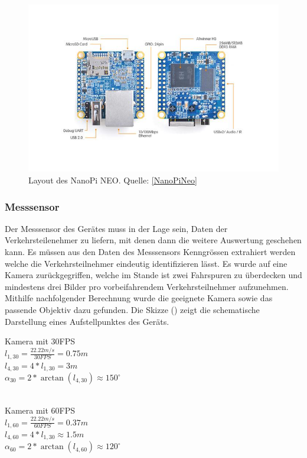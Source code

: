 \begin{figure}[H]
  \centering
  \includegraphics[height=0.6\textwidth]{Hardware/NanoPi_Neo.jpg} 
  \caption{Layout des NanoPi NEO. Quelle: \ref{NanoPiNeo}}
  \label{bLayout}
\end{figure}

\subsubsection{Messsensor}
Der Messsensor des Gerätes muss in der Lage sein, Daten der Verkehrsteilenehmer zu liefern, mit denen dann die weitere Auswertung geschehen kann. Es müssen aus den Daten des Messsensors Kenngrössen extrahiert werden welche die Verkehrsteilnehmer eindeutig identifizieren lässt. Es wurde auf eine Kamera zurückgegriffen, welche im Stande ist zwei Fahrspuren zu überdecken und mindestens drei Bilder pro vorbeifahrendem Verkehrsteilnehmer aufzunehmen. \\
Mithilfe nachfolgender Berechnung wurde die geeignete Kamera sowie das passende Objektiv dazu gefunden. Die Skizze () zeigt die schematische Darstellung eines Aufstellpunktes des Geräts.
\begin{citemize}

\item Kamera mit 30FPS \\
$l_{ 1,30 } = \frac{ 22.22 m/s }{ 30 FPS} = 0.75 m$ \\ 
$l_{ 4,30 } = 4 * l_{1,30} = 3 m$\\
$\alpha_{30} = 2* \arctan(l_{4,30 }) \approx 150^\circ$ \\\\


\item Kamera mit 60FPS \\
$l_{ 1,60 } = \frac{ 22.22 m/s }{ 60 FPS} = 0.37 m$ \\ 
$l_{ 4,60 } = 4 * l_{1,30} \approx 1.5 m$\\
$\alpha_{60} = 2* \arctan(l_{4,60 }) \approx 120^\circ$ \\\\
\end{citemize}

